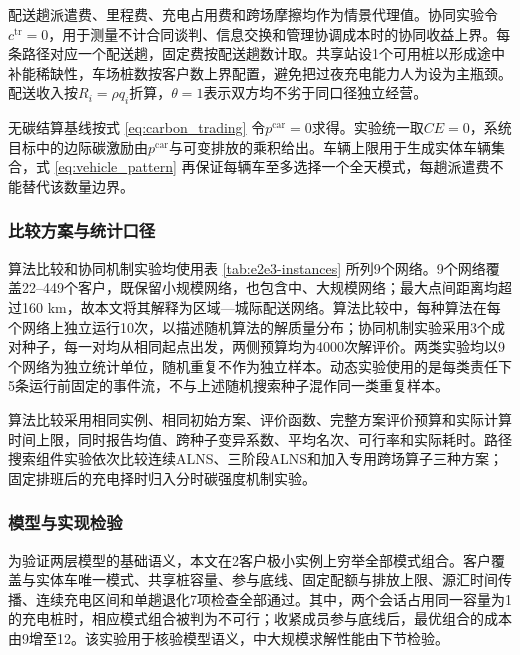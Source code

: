 \documentclass{setp-new}
\newcommand{\setptabsetup}{\fontsize{9pt}{10.5pt}\selectfont\renewcommand{\arraystretch}{0.90}\setlength{\tabcolsep}{2.2pt}\setlength{\aboverulesep}{0.4pt}\setlength{\belowrulesep}{0.4pt}\hbadness=10000}
\begin{document}
配送趟派遣费、里程费、充电占用费和跨场摩擦均作为情景代理值。协同实验令$c^{\mathrm{tr}}=0$，用于测量不计合同谈判、信息交换和管理协调成本时的协同收益上界。每条路径对应一个配送趟，固定费按配送趟数计取。共享站设1个可用桩以形成途中补能稀缺性，车场桩数按客户数上界配置，避免把过夜充电能力人为设为主瓶颈。配送收入按$R_i=\rho q_i$折算，$\theta=1$表示双方均不劣于同口径独立经营。

无碳结算基线按式 \eqref{eq:carbon_trading} 令$p^{\mathrm{car}}=0$求得。实验统一取$CE=0$，系统目标中的边际碳激励由$p^{\mathrm{car}}$与可变排放的乘积给出。车辆上限用于生成实体车辆集合，式 \eqref{eq:vehicle_pattern} 再保证每辆车至多选择一个全天模式，每趟派遣费不能替代该数量边界。

\subsubsection{比较方案与统计口径}

算法比较和协同机制实验均使用表 \ref{tab:e2e3-instances} 所列9个网络。9个网络覆盖22--449个客户，既保留小规模网络，也包含中、大规模网络；最大点间距离均超过160 km，故本文将其解释为区域—城际配送网络。算法比较中，每种算法在每个网络上独立运行10次，以描述随机算法的解质量分布；协同机制实验采用3个成对种子，每一对均从相同起点出发，两侧预算均为4000次解评价。两类实验均以9个网络为独立统计单位，随机重复不作为独立样本。动态实验使用的是每类责任下5条运行前固定的事件流，不与上述随机搜索种子混作同一类重复样本。

算法比较采用相同实例、相同初始方案、评价函数、完整方案评价预算和实际计算时间上限，同时报告均值、跨种子变异系数、平均名次、可行率和实际耗时。路径搜索组件实验依次比较连续ALNS、三阶段ALNS和加入专用跨场算子三种方案；固定排班后的充电择时归入分时碳强度机制实验。

\begin{table}[H]
\centering
\caption{算法与协同机制实验网络}
\label{tab:e2e3-instances}
\setptabsetup

\end{table}

\subsubsection{模型与实现检验}

为验证两层模型的基础语义，本文在2客户极小实例上穷举全部模式组合。客户覆盖与实体车唯一模式、共享桩容量、参与底线、固定配额与排放上限、源汇时间传播、连续充电区间和单趟退化7项检查全部通过。其中，两个会话占用同一容量为1的充电桩时，相应模式组合被判为不可行；收紧成员参与底线后，最优组合的成本由9增至12。该实验用于核验模型语义，中大规模求解性能由下节检验。
\end{document}
